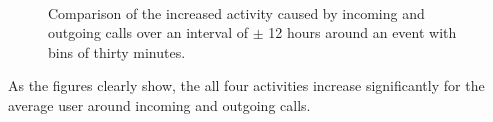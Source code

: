 \begin{figure} %
	\centering
	 \\
	\caption{Comparison of the increased activity caused by incoming and outgoing calls over an interval of $\pm$ 12 hours around an event with bins of thirty minutes.}
	\label{fig:calls_half_hour}
\end{figure}
As the figures clearly show, the all four activities increase significantly for the average user around incoming and outgoing calls.

